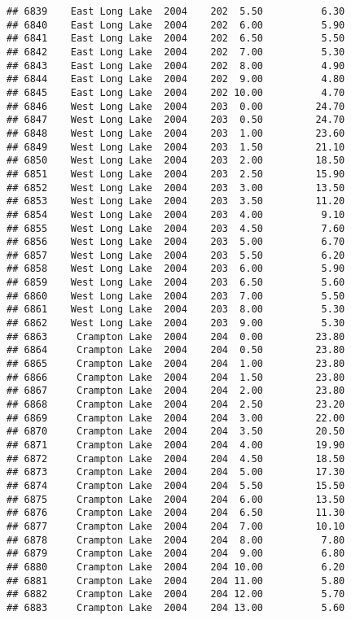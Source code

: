 \documentclass[
]{article}
\begin{document}
\begin{verbatim}
## 6839    East Long Lake  2004    202  5.50          6.30
## 6840    East Long Lake  2004    202  6.00          5.90
## 6841    East Long Lake  2004    202  6.50          5.50
## 6842    East Long Lake  2004    202  7.00          5.30
## 6843    East Long Lake  2004    202  8.00          4.90
## 6844    East Long Lake  2004    202  9.00          4.80
## 6845    East Long Lake  2004    202 10.00          4.70
## 6846    West Long Lake  2004    203  0.00         24.70
## 6847    West Long Lake  2004    203  0.50         24.70
## 6848    West Long Lake  2004    203  1.00         23.60
## 6849    West Long Lake  2004    203  1.50         21.10
## 6850    West Long Lake  2004    203  2.00         18.50
## 6851    West Long Lake  2004    203  2.50         15.90
## 6852    West Long Lake  2004    203  3.00         13.50
## 6853    West Long Lake  2004    203  3.50         11.20
## 6854    West Long Lake  2004    203  4.00          9.10
## 6855    West Long Lake  2004    203  4.50          7.60
## 6856    West Long Lake  2004    203  5.00          6.70
## 6857    West Long Lake  2004    203  5.50          6.20
## 6858    West Long Lake  2004    203  6.00          5.90
## 6859    West Long Lake  2004    203  6.50          5.60
## 6860    West Long Lake  2004    203  7.00          5.50
## 6861    West Long Lake  2004    203  8.00          5.30
## 6862    West Long Lake  2004    203  9.00          5.30
## 6863     Crampton Lake  2004    204  0.00         23.80
## 6864     Crampton Lake  2004    204  0.50         23.80
## 6865     Crampton Lake  2004    204  1.00         23.80
## 6866     Crampton Lake  2004    204  1.50         23.80
## 6867     Crampton Lake  2004    204  2.00         23.80
## 6868     Crampton Lake  2004    204  2.50         23.20
## 6869     Crampton Lake  2004    204  3.00         22.00
## 6870     Crampton Lake  2004    204  3.50         20.50
## 6871     Crampton Lake  2004    204  4.00         19.90
## 6872     Crampton Lake  2004    204  4.50         18.50
## 6873     Crampton Lake  2004    204  5.00         17.30
## 6874     Crampton Lake  2004    204  5.50         15.50
## 6875     Crampton Lake  2004    204  6.00         13.50
## 6876     Crampton Lake  2004    204  6.50         11.30
## 6877     Crampton Lake  2004    204  7.00         10.10
## 6878     Crampton Lake  2004    204  8.00          7.80
## 6879     Crampton Lake  2004    204  9.00          6.80
## 6880     Crampton Lake  2004    204 10.00          6.20
## 6881     Crampton Lake  2004    204 11.00          5.80
## 6882     Crampton Lake  2004    204 12.00          5.70
## 6883     Crampton Lake  2004    204 13.00          5.60

\end{verbatim}
\end{document}
